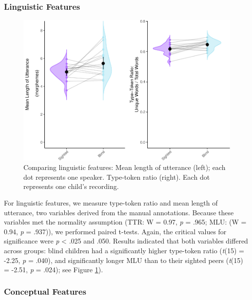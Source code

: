 \documentclass[
  man,floatsintext]{apa6}
\begin{document}
\hypertarget{linguistic-features-1}{%
\subsubsection{Linguistic Features}\label{linguistic-features-1}}

\begin{figure}
\centering
\includegraphics{input_quality_manuscript_files/figure-latex/linguistic-plots-1.pdf}
\caption{\label{fig:linguistic-plots}Comparing linguistic features: Mean length of utterance (left); each dot represents one speaker. Type-token ratio (right). Each dot represents one child's recording.}
\end{figure}

For linguistic features, we measure type-token ratio and mean length of utterance, two variables derived from the manual annotations. Because these variables met the normality assumption (TTR: W = 0.97, \emph{p} = .965; MLU: (W = 0.94, \emph{p} = .937)), we performed paired t-tests. Again, the critical values for significance were \emph{p} \textless{} .025 and .050. Results indicated that both variables differed across groups: blind children had a significantly higher type-token ratio (\emph{t}(15) = -2.25, \emph{p} = .040), and significantly longer MLU than to their sighted peers (\emph{t}(15) = -2.51, \emph{p} = .024); see Figure \ref{fig:linguistic-plots}).

\hypertarget{conceptual-features-1}{%
\subsubsection{Conceptual Features}\label{conceptual-features-1}}
\end{document}
